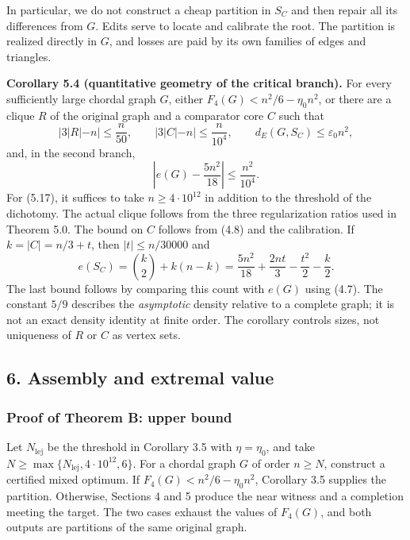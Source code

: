 \documentclass[english,11pt,a4paper]{article}
\begin{document}
In particular, we do not construct a cheap partition in \(S_C\) and then repair all its differences from \(G\). Edits serve to locate and calibrate the root. The partition is realized directly in \(G\), and losses are paid by its own families of edges and triangles.


\textbf{Corollary 5.4 (quantitative geometry of the critical branch).} For every sufficiently large chordal graph \(G\), either \(F_4(G)<n^2/6-\eta_0n^2\), or there are a clique \(R\) of the original graph and a comparator core \(C\) such that \[
|3|R|-n|\le\frac n{50},\qquad
|3|C|-n|\le\frac n{10^4},\qquad
d_E(G,S_C)\le\varepsilon_0n^2,
\tag{5.17}
\] and, in the second branch, \[
\left|e(G)-\frac{5n^2}{18}\right|\le\frac{n^2}{10^4}.
\tag{5.18}
\] For (5.17), it suffices to take \(n\ge4\cdot10^{12}\) in addition to the threshold of the dichotomy. The actual clique follows from the three regularization ratios used in Theorem 5.0. The bound on \(C\) follows from (4.8) and the calibration. If \(k=|C|=n/3+t\), then \(|t|\le n/30000\) and \[
e(S_C)=\binom k2+k(n-k)
=\frac{5n^2}{18}+\frac{2nt}{3}-\frac{t^2}{2}-\frac{k}{2}.
\] The last bound follows by comparing this count with \(e(G)\) using (4.7). The constant \(5/9\) describes the \emph{asymptotic} density relative to a complete graph; it is not an exact density identity at finite order. The corollary controls sizes, not uniqueness of \(R\) or \(C\) as vertex sets.

\subsection{6. Assembly and extremal value}\label{assembly-and-extremal-value}

\subsubsection{Proof of Theorem B: upper bound}\label{proof-of-theorem-b-upper-bound}

Let \(N_{\mathrm{lej}}\) be the threshold in Corollary 3.5 with \(\eta=\eta_0\), and take \(N\ge\max\{N_{\mathrm{lej}},4\cdot10^{12},6\}\). For a chordal graph \(G\) of order \(n\ge N\), construct a certified mixed optimum. If \(F_4(G)<n^2/6-\eta_0n^2\), Corollary 3.5 supplies the partition. Otherwise, Sections 4 and 5 produce the near witness and a completion meeting the target. The two cases exhaust the values of \(F_4(G)\), and both outputs are partitions of the same original graph.
\end{document}
